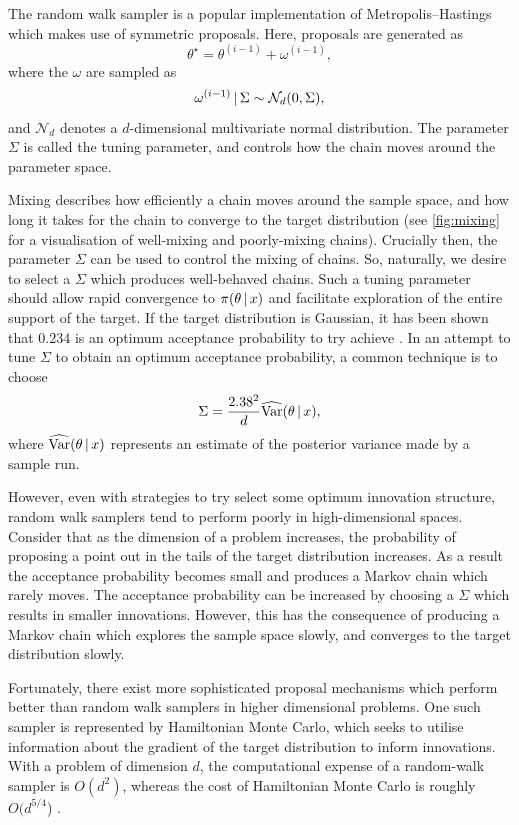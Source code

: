 The random walk sampler is a popular implementation of Metropolis--Hastings
which makes use of symmetric proposals. Here, proposals are generated as
\begin{equation*}
  \theta^\star = \theta^{(i-1)} + \omega^{(i-1)},
\end{equation*}
where the $\omega$ are sampled as
\begin{equation*}
   \omega^{(i-1)} \,|\, \Sigma \sim \mathcal{N}_d(0, \Sigma),
\end{equation*}
and $\mathcal{N}_d$ denotes a $d$-dimensional multivariate normal distribution.
The parameter $\Sigma$ is called the tuning parameter, and controls how the
chain moves around the parameter space.

Mixing describes how efficiently a chain moves around the sample space, and how
long it takes for the chain to converge to the target distribution (see
\cref{fig:mixing} for a visualisation of well-mixing and poorly-mixing chains).
Crucially then, the parameter $\Sigma$ can be used to control the mixing of
chains. So, naturally, we desire to select a $\Sigma$ which produces
well-behaved chains. Such a tuning parameter should allow rapid convergence to
$\pi(\theta \,|\, x)$ and facilitate exploration of the entire support of the
target. If the target distribution is Gaussian, it has been shown that $0.234$
is an optimum acceptance probability to try achieve \parencite{roberts01}. In
an attempt to tune $\Sigma$ to obtain an optimum acceptance probability, a
common technique is to choose 
\begin{equation*}
  \Sigma = \frac{2.38^2}{d} \widehat{\text{Var}}(\theta \,|\, x),
\end{equation*}
where $\widehat{\text{Var}}(\theta \,|\, x)$ represents an estimate of the
posterior variance made by a sample run.

However, even with strategies to try select some optimum innovation structure,
random walk samplers tend to perform poorly in high-dimensional spaces.
Consider that as the dimension of a problem increases, the probability of
proposing a point out in the tails of the target distribution increases. As a
result the acceptance probability becomes small and produces a Markov chain
which rarely moves. The acceptance probability can be increased by choosing a
$\Sigma$ which results in smaller innovations. However, this has the
consequence of producing a Markov chain which explores the sample space slowly,
and converges to the target distribution slowly.

Fortunately, there exist more sophisticated proposal mechanisms which perform
better than random walk samplers in higher dimensional problems. One such
sampler is represented by Hamiltonian Monte Carlo, which seeks to utilise
information about the gradient of the target distribution to inform
innovations. With a problem of dimension $d$, the computational expense of a
random-walk sampler is $O(d^2)$, whereas the cost of Hamiltonian Monte Carlo is
roughly $O(d^{5/4}$) \parencite{creutz88}. 

